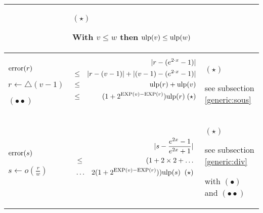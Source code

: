 \documentclass[12pt]{amsart}
\def\pinf{\bigtriangleup}
\def\ulp{{\rm ulp}}
\def\exp{{\rm EXP}}
\begin{document}
\begin{center}
\begin{tabular}{l|l |l}
\begin{minipage}{7.5cm}
\end{minipage} &
\begin{minipage}{6cm}
$(\star)$

With $v \leq w$ then $\ulp(v) \leq \ulp(w)$ 

\end{minipage}\\\hline
\begin{minipage}{2.5cm}
${\textnormal{error}}(r)$


$r \leftarrow \pinf(v-1) $

$(\bullet\bullet)$
\end{minipage} &
\begin{minipage}{7.5cm}



\begin{eqnarray}\nonumber
  &&|r-(e^{2 \cdot x}-1)| \\\nonumber
  &\leq&  |r - (v-1)|+|(v-1) - (e^{2 \cdot x}-1)|\\\nonumber
  &\leq&  \ulp(r) + \ulp(v)\\\nonumber
  &\leq&  (1+2^{\exp(v)-\exp(r)}) \ulp(r)\;(\star)\\\nonumber
\end{eqnarray}

\end{minipage} &
\begin{minipage}{6cm}
$(\star)$


see subsection \ref{generic:sous}

\end{minipage}\\\hline
\begin{minipage}{2.5cm}
${\textnormal{error}}(s)$


$s \leftarrow o(\frac{r}{w}) $
\end{minipage} &
\begin{minipage}{7.5cm}



\begin{eqnarray}\nonumber
  &&|s-\frac{e^{2x}-1}{e^{2x}+1}| \\\nonumber
  &\leq& (1+2 \times 2+ \hdots\\\nonumber
  &\hdots& 2(1+2^{\exp(v)-\exp(r)})) \ulp(s) \;\;(\star)\\\nonumber
\end{eqnarray}

\end{minipage} &
\begin{minipage}{6cm}
$(\star)$


see subsection \ref{generic:div}


with $(\bullet)$ and $(\bullet\bullet)$

\end{minipage}
\end{tabular}
\end{center}
\end{document}
